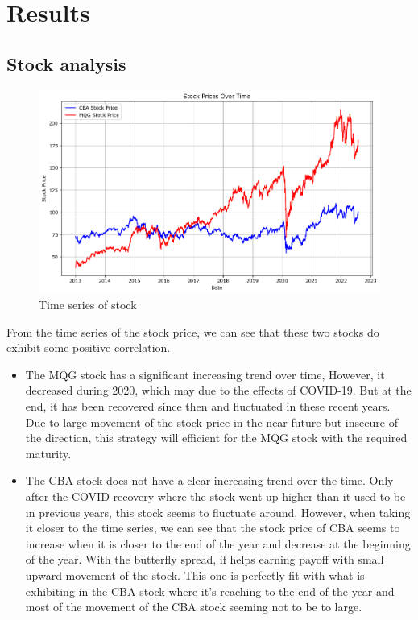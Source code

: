 \section{Results}
\subsection{Stock analysis}
\begin{figure}[H]
    \centering
    \includegraphics[width=1\linewidth]{image/time_series.png}
    \caption{Time series of stock}
    \label{fig:Time_series_stock}
\end{figure}
From the time series of the stock price, we can see that these two stocks do exhibit some positive correlation.
\begin{itemize}
    \item The MQG stock has a significant increasing trend over time, However, it decreased during 2020, which may due to the effects of COVID-19. But at the end, it has been recovered since then and fluctuated in these recent years. Due to large movement of the stock price in the near future but insecure of the direction, this strategy will efficient for the MQG stock with the required maturity.
    \item The CBA stock does not have a clear increasing trend over the time. Only after the COVID recovery where the stock went up higher than it used to be in previous years, this stock seems to fluctuate around. However, when taking it closer to the time series, we can see that the stock price of CBA seems to increase when it is closer to the end of the year and decrease at the beginning of the year. With the butterfly spread, if helps earning payoff with small upward movement of the stock. This one is perfectly fit with what is exhibiting in the CBA stock where it's reaching to the end of the year and most of the movement of the CBA stock seeming not to be to large.
\end{itemize}
